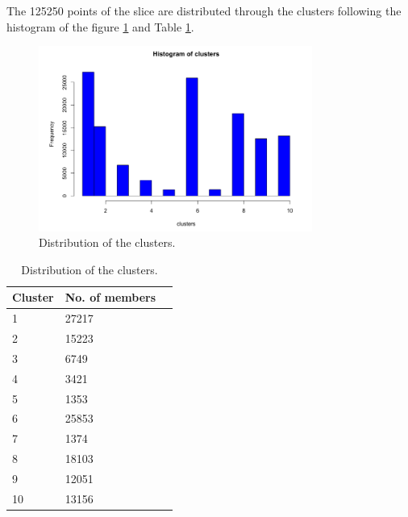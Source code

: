 The 125250 points of the slice are distributed through the clusters following the histogram of the figure \ref{fig:Clusters_histogram} and Table \ref{tab:distribution_of_the_clusters}. 

\begin{figure}[H]
    \centering
    \includegraphics[width=0.8\textwidth]{images/Clusters_histogram.png}
    \caption{Distribution of the clusters.}
    \label{fig:Clusters_histogram}
\end{figure}

\begin{table}
\begin{center}
    \begin{tabular}{|l|l|l|}
    \hline
    \textbf{Cluster} & \textbf{No. of members}         \\ \hline
    1     & 27217              \\ \hline
    2     & 15223             \\ \hline
    3     & 6749            \\ \hline
    4     & 3421               \\ \hline
    5     & 1353                \\ \hline
    6     & 25853               \\ \hline
    7     & 1374                 \\ \hline
    8     & 18103                 \\ \hline
    9     & 12051            \\ \hline
    10   & 13156              \\ \hline
    \end{tabular}
    \caption {Distribution of the clusters.}
    \label{tab:distribution_of_the_clusters}
    \end{center}
\end{table}

